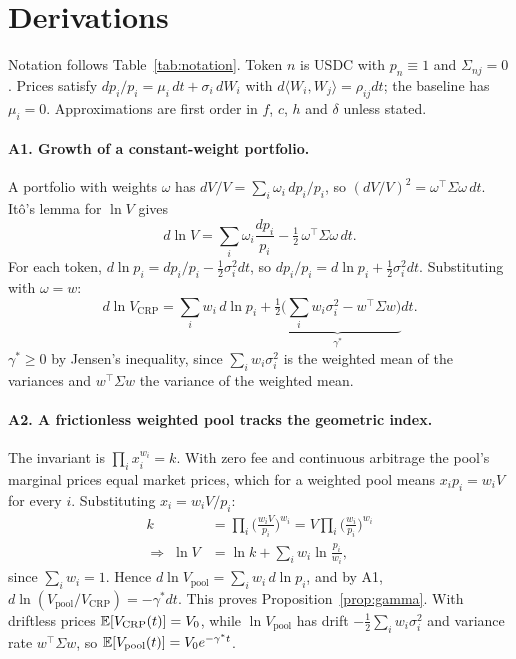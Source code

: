 \appendix
\section{Derivations}
\label{app:deriv}

Notation follows Table~\ref{tab:notation}. Token $n$ is USDC with $p_n\equiv1$ and $\Sigma_{nj}=0$. Prices satisfy $dp_i/p_i=\mu_i\,dt+\sigma_i\,dW_i$ with $d\langle W_i,W_j\rangle=\rho_{ij}dt$; the baseline has $\mu_i=0$. Approximations are first order in $f$, $c$, $h$ and $\delta$ unless stated.

\paragraph{A1. Growth of a constant-weight portfolio.} A portfolio with weights $\omega$ has $dV/V=\sum_i\omega_i\,dp_i/p_i$, so $(dV/V)^2=\omega^{\top}\Sigma\omega\,dt$. It\^o's lemma for $\ln V$ gives
\begin{equation}
d\ln V=\sum_i\omega_i\frac{dp_i}{p_i}-\tfrac12\,\omega^{\top}\Sigma\omega\,dt .
\end{equation}
For each token, $d\ln p_i=dp_i/p_i-\tfrac12\sigma_i^2dt$, so $dp_i/p_i=d\ln p_i+\tfrac12\sigma_i^2dt$. Substituting with $\omega=w$:
\begin{equation}
d\ln V_{\mathrm{CRP}}=\sum_i w_i\,d\ln p_i+\underbrace{\tfrac12\Big(\sum_i w_i\sigma_i^2-w^{\top}\Sigma w\Big)}_{\gamma^{*}}dt .
\end{equation}
$\gamma^{*}\ge0$ by Jensen's inequality, since $\sum_iw_i\sigma_i^2$ is the weighted mean of the variances and $w^{\top}\Sigma w$ the variance of the weighted mean.

\paragraph{A2. A frictionless weighted pool tracks the geometric index.} The invariant is $\prod_ix_i^{w_i}=k$. With zero fee and continuous arbitrage the pool's marginal prices equal market prices, which for a weighted pool means $x_ip_i=w_iV$ for every $i$. Substituting $x_i=w_iV/p_i$:
\begin{equation}
\begin{aligned}
k&=\prod_i\Big(\frac{w_iV}{p_i}\Big)^{w_i}=V\prod_i\Big(\frac{w_i}{p_i}\Big)^{w_i}\\
\Rightarrow\;\ln V&=\ln k+\sum_iw_i\ln\frac{p_i}{w_i},
\end{aligned}
\end{equation}
since $\sum_iw_i=1$. Hence $d\ln V_{\mathrm{pool}}=\sum_iw_i\,d\ln p_i$, and by A1, $d\ln(V_{\mathrm{pool}}/V_{\mathrm{CRP}})=-\gamma^{*}dt$. This proves Proposition~\ref{prop:gamma}. With driftless prices $\mathbb{E}[V_{\mathrm{CRP}}(t)]=V_0$, while $\ln V_{\mathrm{pool}}$ has drift $-\tfrac12\sum_iw_i\sigma_i^2$ and variance rate $w^{\top}\Sigma w$, so $\mathbb{E}[V_{\mathrm{pool}}(t)]=V_0e^{-\gamma^{*}t}$.

